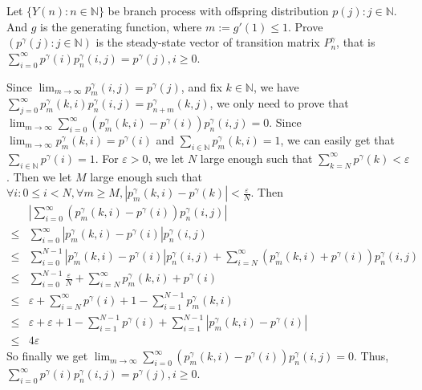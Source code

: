 \documentclass[../main]{subfiles}
\begin{document}
\begin{problem}\label{pro:5}
  Let \(\{Y(n): n \in \mathbb{N}\}\) be branch process with offspring distribution \(p(j): j \in \mathbb{N}\).
  And \(g\) is the generating function, where \(m :=g' (1) \leq 1\).
  Prove \((p^\gamma(j): j \in \mathbb{N})\) is the steady-state vector of
  transition matrix \(P_n^\gamma\), that is \(\sum_{i =0}^{\infty} p^\gamma(i)p_n^\gamma(i,j)=p^{\gamma}(j), i \geq 0\).
\end{problem}
\begin{solution}
  Since \(\lim_{m \to \infty}p_m^\gamma(i,j)=p^\gamma(j)\), and fix \(k \in \mathbb{N}\), we have
  \(\sum_{j=0}^{\infty} p_m^\gamma(k,i)p_n^\gamma(i,j)=p_{n+m}^\gamma(k,j)\),
  we only need to prove that \(\lim_{m \to \infty}\sum_{i=0}^{\infty} (p_m^\gamma(k,i)-p^\gamma(i))p_n^\gamma(i,j)=0\).
  Since \(\lim_{m \to \infty}p_m^\gamma(k,i) =p^\gamma(i)\) and \(\sum_{i \in \mathbb{N}}p_m^\gamma(k,i)=1\),
  we can easily get that \(\sum_{i \in \mathbb{N}}p^\gamma(i)=1\).
  For \(\varepsilon>0\), we let \(N\) large enough such that \(\sum_{k=N}^{\infty} p^\gamma(k)<\varepsilon\).
  Then we let \(M\) large enough such that \(\forall i:0 \leq i <N,\forall m \geq M,|p_{m}^\gamma(k,i)-p^\gamma(k)|<\frac{\varepsilon}{N}\).
  Then
  \[
    \begin{aligned}
           & \left|\sum_{i=0}^{\infty} (p_m^\gamma(k,i)-p^\gamma(i))p_n^\gamma(i,j)\right|                                                                      \\
      \leq & \sum_{i=0}^{\infty} |p_m^\gamma(k,i)-p^\gamma(i)|p_n^\gamma(i,j)                                                                                   \\
      \leq & \sum_                    {i=0}^{N-1} |p_m^\gamma(k,i)-p^\gamma(i)|p_n^\gamma(i,j)+\sum_{i=N}^{\infty} (p_m^\gamma(k,i)+p^\gamma(i))p_n^\gamma(i,j) \\
      \leq & \sum_{i=0}^              {N-1} \frac{\varepsilon}{N} + \sum_{i=N}^{\infty} p_m^\gamma(k,i)+p^\gamma(i)                                             \\
      \leq & \varepsilon+\sum_        {i=N}^{\infty} p^\gamma(i) +1- \sum_{i=1}^{N-1} p_m^\gamma(k,i)                                                           \\
      \leq & \varepsilon + \varepsilon + 1 - \sum_{i=1}^{N-1} p^\gamma(i) + \sum_{i=1}^{N-1} |p_m^\gamma(k,i)-p^\gamma(i)|                                      \\
      \leq & 4\varepsilon
    \end{aligned}
  \]
  So finally we get \(\lim_{m \to \infty}\sum_{i=0}^{\infty} (p_m^\gamma(k,i)-p^\gamma(i))p_n^\gamma(i,j)=0\).
  Thus, \(\sum_{i =0}^{\infty} p^\gamma(i)p_n^\gamma(i,j)=p^{\gamma}(j), i \geq 0\).
\end{solution}
\end{document}
